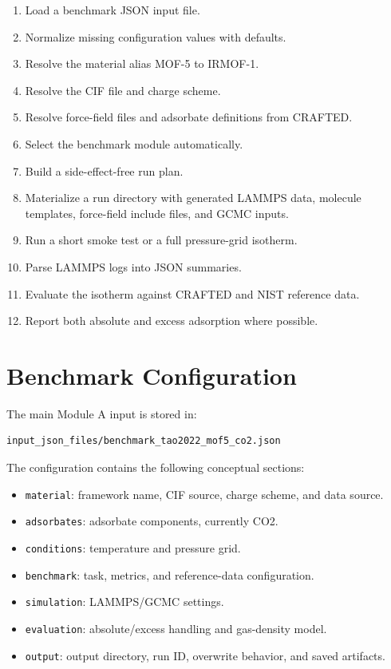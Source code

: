 \documentclass[11pt,a4paper]{article}
\begin{document}
\begin{enumerate}
    \item Load a benchmark JSON input file.
    \item Normalize missing configuration values with defaults.
    \item Resolve the material alias MOF-5 to IRMOF-1.
    \item Resolve the CIF file and charge scheme.
    \item Resolve force-field files and adsorbate definitions from CRAFTED.
    \item Select the benchmark module automatically.
    \item Build a side-effect-free run plan.
    \item Materialize a run directory with generated LAMMPS data, molecule templates, force-field include files, and GCMC inputs.
    \item Run a short smoke test or a full pressure-grid isotherm.
    \item Parse LAMMPS logs into JSON summaries.
    \item Evaluate the isotherm against CRAFTED and NIST reference data.
    \item Report both absolute and excess adsorption where possible.
\end{enumerate}



\section{Benchmark Configuration}

The main Module A input is stored in:

\begin{lstlisting}
input_json_files/benchmark_tao2022_mof5_co2.json
\end{lstlisting}

The configuration contains the following conceptual sections:

\begin{itemize}
    \item \texttt{material}: framework name, CIF source, charge scheme, and data source.
    \item \texttt{adsorbates}: adsorbate components, currently CO2.
    \item \texttt{conditions}: temperature and pressure grid.
    \item \texttt{benchmark}: task, metrics, and reference-data configuration.
    \item \texttt{simulation}: LAMMPS/GCMC settings.
    \item \texttt{evaluation}: absolute/excess handling and gas-density model.
    \item \texttt{output}: output directory, run ID, overwrite behavior, and saved artifacts.
\end{itemize}
\end{document}
